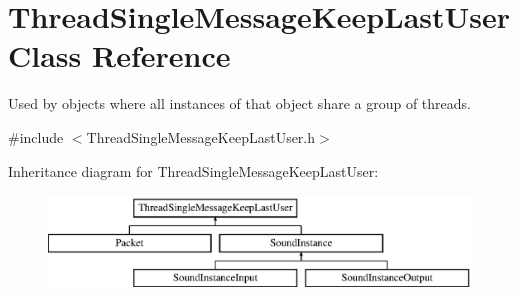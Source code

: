 \hypertarget{class_thread_single_message_keep_last_user}{
\section{ThreadSingleMessageKeepLastUser Class Reference}
\label{class_thread_single_message_keep_last_user}
}


Used by objects where all instances of that object share a group of threads.  




{\ttfamily \#include $<$ThreadSingleMessageKeepLastUser.h$>$}

Inheritance diagram for ThreadSingleMessageKeepLastUser:\begin{figure}[H]
\begin{center}
\leavevmode
\includegraphics[height=2.500000cm]{class_thread_single_message_keep_last_user}
\end{center}
\end{figure}
